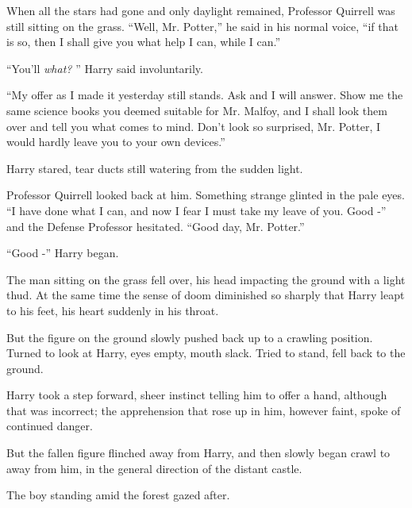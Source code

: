 When all the stars had gone and only daylight remained, Professor
Quirrell was still sitting on the grass. ``Well, Mr. Potter,'' he said
in his normal voice, ``if that is so, then I shall give you what help I
can, while I can.''

``You'll \emph{what?} '' Harry said involuntarily.

``My offer as I made it yesterday still stands. Ask and I will answer.
Show me the same science books you deemed suitable for Mr. Malfoy, and I
shall look them over and tell you what comes to mind. Don't look so
surprised, Mr. Potter, I would hardly leave you to your own devices.''

Harry stared, tear ducts still watering from the sudden light.

Professor Quirrell looked back at him. Something strange glinted in the
pale eyes. ``I have done what I can, and now I fear I must take my leave
of you. Good -'' and the Defense Professor hesitated. ``Good day, Mr.
Potter.''

``Good -'' Harry began.

The man sitting on the grass fell over, his head impacting the ground
with a light thud. At the same time the sense of doom diminished so
sharply that Harry leapt to his feet, his heart suddenly in his throat.

But the figure on the ground slowly pushed back up to a crawling
position. Turned to look at Harry, eyes empty, mouth slack. Tried to
stand, fell back to the ground.

Harry took a step forward, sheer instinct telling him to offer a hand,
although that was incorrect; the apprehension that rose up in him,
however faint, spoke of continued danger.

But the fallen figure flinched away from Harry, and then slowly began
crawl to away from him, in the general direction of the distant castle.

The boy standing amid the forest gazed after.
